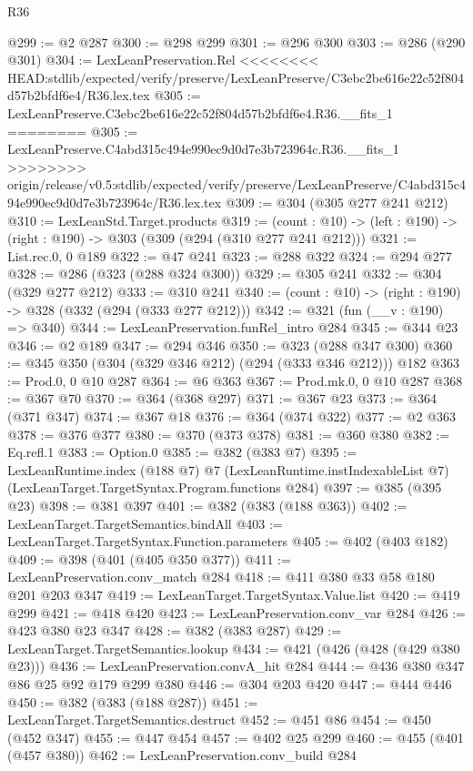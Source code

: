 \begin{lexlean}{R36}
\begin{coremodule}
{{{{{{{{@299 := @2 @287
@300 := @298 @299
@301 := @296 @300
@303 := @286 (@290 @301)
@304 := LexLeanPreservation.Rel
<<<<<<<< HEAD:stdlib/expected/verify/preserve/LexLeanPreserve/C3ebc2be616e22c52f804d57b2bfdf6e4/R36.lex.tex
@305 := LexLeanPreserve.C3ebc2be616e22c52f804d57b2bfdf6e4.R36.__fits_1
========
@305 := LexLeanPreserve.C4abd315c494e990ec9d0d7e3b723964c.R36.__fits_1
>>>>>>>> origin/release/v0.5:stdlib/expected/verify/preserve/LexLeanPreserve/C4abd315c494e990ec9d0d7e3b723964c/R36.lex.tex
@309 := @304 (@305 @277 @241 @212)
@310 := LexLeanStd.Target.products
@319 := (count : @10) -> (left : @190) -> (right : @190) -> @303 (@309 (@294 (@310 @277 @241 @212)))
@321 := List.rec.{0, 0} @189
@322 := @47 @241
@323 := @288 @322
@324 := @294 @277
@328 := @286 (@323 (@288 @324 @300))
@329 := @305 @241
@332 := @304 (@329 @277 @212)
@333 := @310 @241
@340 := (count : @10) -> (right : @190) -> @328 (@332 (@294 (@333 @277 @212)))
@342 := @321 (fun (__v : @190) => @340)
@344 := LexLeanPreservation.funRel_intro @284
@345 := @344 @23
@346 := @2 @189
@347 := @294 @346
@350 := @323 (@288 @347 @300)
@360 := @345 @350 (@304 (@329 @346 @212) (@294 (@333 @346 @212))) @182
@363 := Prod.{0, 0} @10 @287
@364 := @6 @363
@367 := Prod.mk.{0, 0} @10 @287
@368 := @367 @70
@370 := @364 (@368 @297)
@371 := @367 @23
@373 := @364 (@371 @347)
@374 := @367 @18
@376 := @364 (@374 @322)
@377 := @2 @363
@378 := @376 @377
@380 := @370 (@373 @378)
@381 := @360 @380
@382 := Eq.refl.{1}
@383 := Option.{0}
@385 := @382 (@383 @7)
@395 := LexLeanRuntime.index
    (@188 @7)
    @7
    (LexLeanRuntime.instIndexableList @7)
    (LexLeanTarget.TargetSyntax.Program.functions @284)
@397 := @385 (@395 @23)
@398 := @381 @397
@401 := @382 (@383 (@188 @363))
@402 := LexLeanTarget.TargetSemantics.bindAll
@403 := LexLeanTarget.TargetSyntax.Function.parameters
@405 := @402 (@403 @182)
@409 := @398 (@401 (@405 @350 @377))
@411 := LexLeanPreservation.conv_match @284
@418 := @411 @380 @33 @58 @180 @201 @203 @347
@419 := LexLeanTarget.TargetSyntax.Value.list
@420 := @419 @299
@421 := @418 @420
@423 := LexLeanPreservation.conv_var @284
@426 := @423 @380 @23 @347
@428 := @382 (@383 @287)
@429 := LexLeanTarget.TargetSemantics.lookup
@434 := @421 (@426 (@428 (@429 @380 @23)))
@436 := LexLeanPreservation.convA_hit @284
@444 := @436 @380 @347 @86 @25 @92 @179 @299 @380
@446 := @304 @203 @420
@447 := @444 @446
@450 := @382 (@383 (@188 @287))
@451 := LexLeanTarget.TargetSemantics.destruct
@452 := @451 @86
@454 := @450 (@452 @347)
@455 := @447 @454
@457 := @402 @25 @299
@460 := @455 (@401 (@457 @380))
@462 := LexLeanPreservation.conv_build @284
}}}}}}}}
\end{coremodule}
\end{lexlean}
